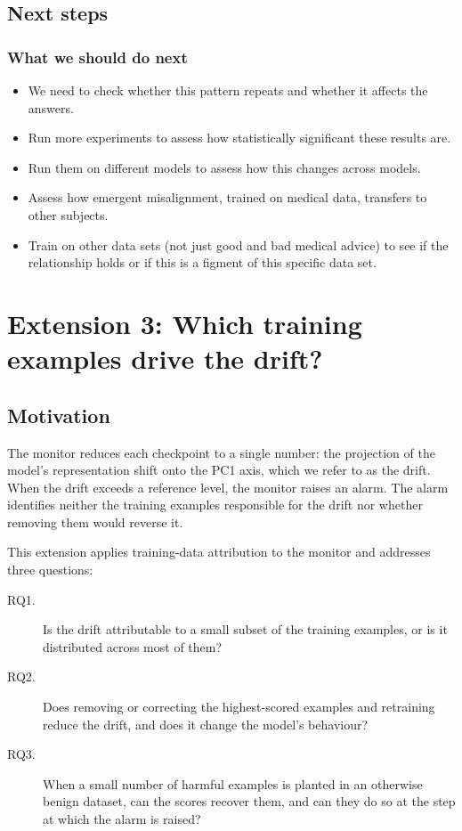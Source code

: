\documentclass[10pt]{article}
\begin{document}
\subsection{Next steps}

\subsubsection{What we should do next}

\begin{itemize}
  \item We need to check whether this pattern repeats and whether it affects the answers.
  \item Run more experiments to assess how statistically significant these results are.
  \item Run them on different models to assess how this changes across models.
  \item Assess how emergent misalignment, trained on medical data, transfers to other subjects.
  \item Train on other data sets (not just good and bad medical advice) to see if the relationship
  holds or if this is a figment of this specific data set.
\end{itemize}

\section{Extension 3: Which training examples drive the drift?}

\subsection{Motivation}

The monitor reduces each checkpoint to a single number: the projection of the model's
representation shift onto the PC1 axis, which we refer to as the drift. When the drift exceeds a
reference level, the monitor raises an alarm. The alarm identifies neither the training examples
responsible for the drift nor whether removing them would reverse it.

This extension applies training-data attribution to the monitor and addresses three questions:

\begin{description}
  \item[RQ1.] Is the drift attributable to a small subset of the training examples, or is it
  distributed across most of them?
  \item[RQ2.] Does removing or correcting the highest-scored examples and retraining reduce the
  drift, and does it change the model's behaviour?
  \item[RQ3.] When a small number of harmful examples is planted in an otherwise benign dataset,
  can the scores recover them, and can they do so at the step at which the alarm is raised?
\end{description}
\end{document}
